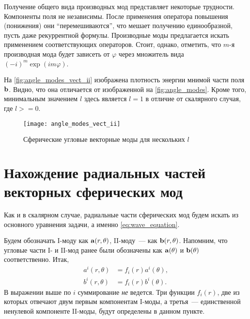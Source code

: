 \documentclass[12pt,a4paper]{article}
\begin{document}
        Получение общего вида производных мод представляет некоторые трудности. Компоненты поля не независимы. После применения оператора повышения (понижения) они \enquote{перемешиваются}, что мешает получению единообразной, пусть даже рекуррентной формулы. Производные моды предлагается искать применением соответствующих операторов. Стоит, однако, отметить, что $m$-я производная мода будет зависеть от $\varphi$ через множитель вида $(-i)^m \exp(i m \varphi)$.

        На \autoref{fig:angle_modes_vect_ii} изображена плотность энергии мнимой части поля $\vb{b}$. Видно, что она отличается от изображенной на \autoref{fig:angle_modes}. Кроме того, минимальным значением $l$ здесь является $l = 1$ в отличие от скалярного случая, где $l >= 0$.
        \begin{figure}[h]
            \centering
            \texttt{[image: angle\_modes\_vect\_ii]}
            \caption[]{Сферические угловые векторные моды для нескольких $l$}
            \label{fig:angle_modes_vect_ii}
        \end{figure}


    \section{Нахождение радиальных частей векторных сферических мод}

        Как и в скалярном случае, радиальные части сферических мод будем искать из основного уравнения задачи, а именно \autoref{eq:wave_equation}.

        Будем обозначать $\mathrm{I}$-моду как $\vb{a}(r,\theta)$, $\mathrm{II}$-моду~--- как $\vb{b}(r,\theta)$. Напомним, что угловые части $\mathrm{I}$- и $\mathrm{II}$-мод ранее были обозначены как $\vb{a}(\theta)$ и $\vb{b}(\theta)$ соответственно. Итак,
        \begin{equation}\begin{aligned}\label{eq:generic_vector_modes}
            a^i(r,\theta) &= f_i(r) a^i(\theta), \\
            b^i(r,\theta) &= f_i(r) b^i(\theta).
        \end{aligned}\end{equation}
        В выражении выше по $i$ суммирование \textit{не} ведется. Три функции $f_i(r)$, две из которых отвечают двум первым компонентам $\mathrm{I}$-моды, а третья~--- единственной ненулевой компоненте $\mathrm{II}$-моды, будут определены в данном пункте.
\end{document}
